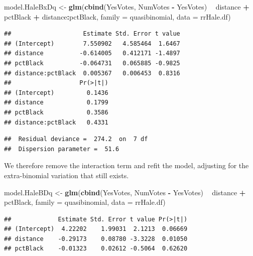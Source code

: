\documentclass[
]{krantz}
\newenvironment{Shaded}{\begin{snugshade}}{\end{snugshade}}
\newcommand{\DataTypeTok}[1]{\textcolor[rgb]{0.27,0.27,0.27}{#1}}
\newcommand{\KeywordTok}[1]{\textcolor[rgb]{0.27,0.27,0.27}{\textbf{#1}}}
\newcommand{\NormalTok}[1]{#1}
\newcommand{\OperatorTok}[1]{\textcolor[rgb]{0.43,0.43,0.43}{\textbf{#1}}}
\newcommand{\StringTok}[1]{\textcolor[rgb]{0.5,0.5,0.5}{#1}}
\begin{document}
\begin{Shaded}
\begin{Highlighting}[]
\NormalTok{model.HaleBxDq <-}\StringTok{ }\KeywordTok{glm}\NormalTok{(}\KeywordTok{cbind}\NormalTok{(YesVotes, NumVotes }\OperatorTok{-}\StringTok{ }\NormalTok{YesVotes) }\OperatorTok{~}
\StringTok{  }\NormalTok{distance }\OperatorTok{+}\StringTok{ }\NormalTok{pctBlack }\OperatorTok{+}\StringTok{ }\NormalTok{distance}\OperatorTok{:}\NormalTok{pctBlack, }
  \DataTypeTok{family =}\NormalTok{ quasibinomial, }\DataTypeTok{data =}\NormalTok{ rrHale.df)}
\end{Highlighting}
\end{Shaded}

\begin{verbatim}
##                    Estimate Std. Error t value
## (Intercept)        7.550902   4.585464  1.6467
## distance          -0.614005   0.412171 -1.4897
## pctBlack          -0.064731   0.065885 -0.9825
## distance:pctBlack  0.005367   0.006453  0.8316
##                   Pr(>|t|)
## (Intercept)         0.1436
## distance            0.1799
## pctBlack            0.3586
## distance:pctBlack   0.4331
\end{verbatim}

\begin{verbatim}
##  Residual deviance =  274.2  on  7 df 
##  Dispersion parameter =  51.6
\end{verbatim}

We therefore remove the interaction term and refit the model, adjusting for the extra-binomial variation that still exists.

\begin{Shaded}
\begin{Highlighting}[]
\NormalTok{model.HaleBDq <-}\StringTok{ }\KeywordTok{glm}\NormalTok{(}\KeywordTok{cbind}\NormalTok{(YesVotes, NumVotes }\OperatorTok{-}\StringTok{ }\NormalTok{YesVotes) }\OperatorTok{~}
\StringTok{  }\NormalTok{distance }\OperatorTok{+}\StringTok{ }\NormalTok{pctBlack, }
  \DataTypeTok{family =}\NormalTok{ quasibinomial, }\DataTypeTok{data =}\NormalTok{ rrHale.df)}
\end{Highlighting}
\end{Shaded}

\begin{verbatim}
##             Estimate Std. Error t value Pr(>|t|)
## (Intercept)  4.22202    1.99031  2.1213  0.06669
## distance    -0.29173    0.08780 -3.3228  0.01050
## pctBlack    -0.01323    0.02612 -0.5064  0.62620
\end{verbatim}
\end{document}
